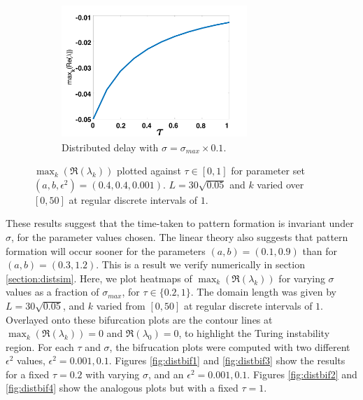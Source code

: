 \begin{figure}[H]
\begin{subfigure}[b]{0.45\textwidth}
        \includegraphics[width=7cm,height=5cm]{p3sigmax10.png}
        \caption{Distributed delay with $\sigma=\sigma_{max}\times0.1$.}
        \label{}
    \end{subfigure}
    \caption{$\max_k(\Re(\lambda_k))$ plotted against $\tau\in[0,1]$ for parameter set $(a,b,\epsilon^2)=(0.4,0.4,0.001)$. $L=30\sqrt{0.05}$ and $k$ varied over $[0,50]$ at regular discrete intervals of $1$.}
    \label{fig:p3}
\end{figure}

These results suggest that the time-taken to pattern formation is invariant under $\sigma$, for the parameter values chosen. The linear theory also suggests that pattern formation will occur sooner for the parameters $(a,b)=(0.1,0.9)$ than for $(a,b)=(0.3,1.2)$. This is a result we verify numerically in section \ref{section:distsim}. Here,  we plot heatmaps of $\max_k(\Re(\lambda_k))$ for varying $\sigma$ values as a fraction of $\sigma_{max}$, for $\tau\in\{0.2,1\}$. The domain length was given by $L=30\sqrt{0.05}$, and $k$ varied from $[0,50]$ at regular discrete intervals of $1$. Overlayed onto these bifurcation plots are the contour lines at $\max_k(\Re(\lambda_k))=0$ and $\Re(\lambda_0)=0$, to highlight the Turing instability region. For each $\tau$ and $\sigma$, the bifrucation plots were computed with two different $\epsilon^2$ values, $\epsilon^2=0.001,0.1$. Figures \ref{fig:distbif1} and \ref{fig:distbif3} show the results for a fixed $\tau=0.2$ with varying $\sigma$, and an $\epsilon^2=0.001,0.1$. Figures \ref{fig:distbif2} and \ref{fig:distbif4} show the analogous plots but with a fixed $\tau=1$.

